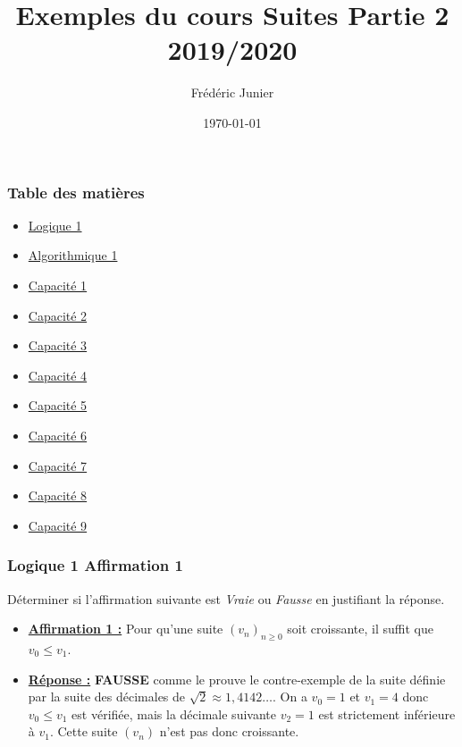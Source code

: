 \documentclass[11pt, hyperref={urlcolor=red,%
            linkcolor=blue, %
            colorlinks=true}]{beamer}
\title[suites]{Exemples du cours Suites Partie 2 2019/2020}
\author[F.Junier]{Fr\'ed\'eric Junier}
\institute[Le Parc]{{\centering Lyc\'ee du Parc \\
1 Boulevard Anatole France \\ 69006 Lyon }}
\date[\today]{\today}
\newcommand{\suite}[1]{\ensuremath{\left(#1_{n}\right)}}
\newcommand{\Suite}[2]{\ensuremath{\left(#1\right)_{#2}}}
\begin{document}
\frame{\titlepage}

 


\begin{frame}
\frametitle{Table des matières}
\begin{itemize}
	\item \hyperlink{logique1}{Logique 1}
    \item \hyperlink{algo1}{Algorithmique 1}
    \item \hyperlink{capacite1}{Capacité 1}
    \item \hyperlink{capacite2}{Capacité 2}
        \item \hyperlink{capacite3}{Capacité 3}
            \item \hyperlink{capacite4}{Capacité 4}
                \item \hyperlink{capacite5}{Capacité 5}
                    \item \hyperlink{capacite6}{Capacité 6}
                     \item \hyperlink{capacite7}{Capacité 7}
                      \item \hyperlink{capacite8}{Capacité 8}
                       \item \hyperlink{capacite9}{Capacité 9}
\end{itemize}

\end{frame}

\begin{frame}
\frametitle{Logique 1 Affirmation 1}
\label{logique1}
Déterminer si l'affirmation suivante est  \textit{Vraie} ou \textit{Fausse} en justifiant la réponse. 



\begin{itemize}
    \item \underline{\textbf{Affirmation 1 :}}
Pour qu'une suite $\Suite{v_{n}}{n \geqslant 0}$  soit croissante, il suffit que   $v_{0} \leqslant v_{1}$. 

\pause \item  \underline{\textbf{Réponse :}} \textbf{ FAUSSE} comme le prouve le contre-exemple de la suite définie par la suite des décimales de $\sqrt{2}\approx 1,4142 \ldots$. On a $v_{0}=1$ et $v_{1}=4$ donc $v_{0}\leqslant v_{1}$ est vérifiée, mais la décimale suivante $v_{2}=1$ est strictement inférieure à $v_{1}$. Cette suite $\suite{v}$ n'est pas donc croissante.
\end{itemize}
	
	

\end{frame}
\end{document}
